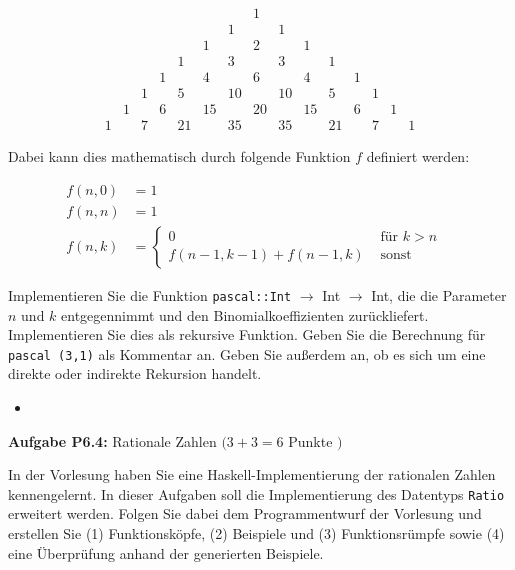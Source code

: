 $$
\begin{array}{cccccccccccccccc} 
  & & & & & & & 1 & & & & & & & \\ 
  & & & & & & 1 & & 1 & & & & & \\ 
  & & & & & 1 & & 2 & & 1 & & & & \\ 
  & & & & 1 & & 3 & & 3 & & 1 & & & \\ 
  & & & 1 & & 4 & & 6 & & 4 & & 1 & & \\ 
  & & 1 & & 5 & & 10 & & 10 & & 5 & & 1 & & 
  \\ & 1 & & 6 & & 15 & & 20 & & 15 & & 6 & & 1 & 
  \\ 1 & & 7 & & 21 & & 35 & & 35 & & 21 & & 7 & & 1
\end{array}
$$

Dabei kann dies mathematisch durch folgende Funktion $f$ definiert werden:

$$
\begin{array}{rlr}
f(n, 0) & =1 \\
f(n, n) & =1 & \\
f(n, k) & = \begin{cases}0 & \text { für } k>n \\
f(n-1, k-1)+f(n-1, k) & \text { sonst }\end{cases}
\end{array}
$$

Implementieren Sie die Funktion \texttt{pascal::Int} $\rightarrow$ Int $\rightarrow$ Int, die die Parameter $n$ und $k$ entgegennimmt und den Binomialkoeffizienten zurückliefert. Implementieren Sie dies als rekursive Funktion. Geben Sie die Berechnung für \texttt{pascal (3,1)} als Kommentar an. Geben Sie außerdem an, ob es sich um eine direkte oder indirekte Rekursion handelt.

\begin{itemize}
  \item []\inputminted{Haskell}{A6_3.hs}
\end{itemize}

\newpage

\textbf{Aufgabe P6.4:} Rationale Zahlen $(3+3=6$ Punkte $)$ 

In der Vorlesung haben Sie eine Haskell-Implementierung der rationalen Zahlen kennengelernt. 
In dieser Aufgaben soll die Implementierung des Datentyps \texttt{Ratio} erweitert werden. Folgen Sie 
dabei dem Programmentwurf der Vorlesung und erstellen Sie (1) Funktionsköpfe, (2) Beispiele 
und (3) Funktionsrümpfe sowie (4) eine Überprüfung anhand der generierten Beispiele.

